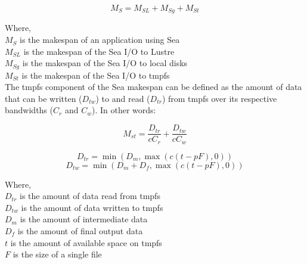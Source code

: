       \begin{equation}\label{eq:sea-comp:snc}
          M_{S} = M_{SL} + M_{Sg} + M_{St}
      \end{equation}

      Where, \\
      $M_{S}$ is the makespan of an application using Sea \\
      $M_{SL}$ is the makespan of the Sea I/O to Lustre \\
      $M_{Sg}$ is the makespan of the Sea I/O to local disks \\
      $M_{St}$ is the makespan of the Sea I/O to tmpfs \\



      The tmpfs component of the Sea makespan can be defined as the amount of
      data that can be written ($D_{tw}$) to and read ($D_{tr}$) from tmpfs over
      its respective bandwidths ($C_{r}$ and $C_{w}$). In other words:

      \begin{equation}\label{eq:sea-comp:mst}
          M_{st} = \frac{D_{tr}}{cC_{r}} + \frac{D_{tw}}{cC_{w}}
      \end{equation}

      \begin{equation*}\label{eq:sea-comp:dtr}
          D_{tr} = \min\left(D_{m}, \max{\left(c(t - pF), 0 \right)} \right)
      \end{equation*}
      \begin{equation*}\label{eq:sea-comp:dtw}
          D_{tw} = \min\left(D_{m} + D_{f}, \max{\left(c(t - pF), 0 \right)} \right)
      \end{equation*}

      Where,\\
      $D_{tr}$ is the amount of data read from tmpfs \\
      $D_{tw}$ is the amount of data written to tmpfs \\
      $D_{m}$ is the amount of intermediate data \\
      $D_{f}$ is the amount of final output data \\
      $t$ is the amount of available space on tmpfs \\
      $F$ is the size of a single file \\

